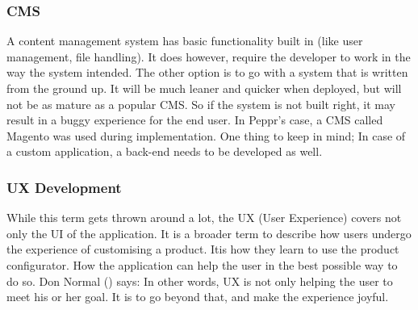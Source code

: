 \newline

\subsubsection{CMS}
A content management system has basic functionality built in (like user management, file handling). It does however, require  the developer to work in the way the system intended. The other option is to go with a system that is written from the ground up. It will be much leaner and quicker when deployed, but will not be as mature as a popular CMS. So if the system is not built right, it may result in a buggy experience for the end user. In Peppr's case, a CMS called Magento was used during implementation. One thing to keep in mind; In case of a custom application, a back-end needs to be developed as well.
\subsubsection{UX Development}
While this term gets thrown around a lot, the UX (User Experience) covers not only the UI of the application. It is a broader term to describe how users undergo the experience of customising a product. Itis how they learn to use the product configurator. How the application can help the user in the best possible way to do so. Don Normal (\cite{userExperience}) says: \newline
{} \newline
In other words, UX is not only helping the user to meet his or her goal. It is to go beyond that, and make the experience joyful.

